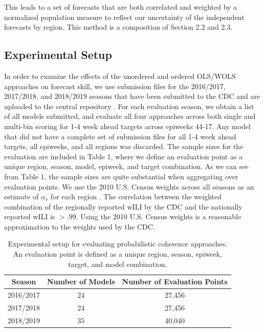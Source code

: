 \documentclass{umassthesis}          %
\begin{document}
This leads to a set of forecasts that are both correlated and weighted by a normalized population measure to reflect our uncertainty of the independent forecasts by region. This method is a composition of Section 2.2 and 2.3.



\subsection{Experimental Setup}

In order to examine the effects of the unordered and ordered OLS/WOLS approaches on forecast skill, we use submission files for the 2016/2017, 2017/2018, and 2018/2019 seasons that have been submitted to the CDC and are uploaded to the central repository \cite{forecasts}. For each evaluation season, we obtain a list of all models submitted, and evaluate all four approaches across both single and multi-bin scoring for 1-4 week ahead targets across epiweeks 44-17. Any model that did not have a complete set of submission files for all 1-4 week ahead targets, all epiweeks, and all regions was discarded.  The sample sizes for the evaluation are included in Table 1, where we define an evaluation point as a unique region, season, model, epiweek, and target combination. As we can see from Table 1, the sample sizes are quite substantial when aggregating over evaluation points. We use the 2010 U.S. Census weights across all seasons as an estimate of $\alpha_r$ for each region \cite{census}. The correlation between the weighted combination of the regionally reported wILI by the CDC and the nationally reported wILI is $>.99$.  Using the 2010 U.S. Census weights is a reasonable approximation to the weights used by the CDC.

\begin{table}[h!]
\caption{Experimental setup for evaluating probabilistic coherence approaches. An evaluation point is defined as a unique region, season, epiweek, target, and model combination.}
\begin{center}
\begin{tabular}{ |c|c|c| }
\hline
 \textbf{Season} & \textbf{Number of Models} & \textbf{Number of Evaluation Points} \\
 \hline
 2016/2017 & 24 & 27,456  \\
 \hline
 2017/2018& 24 & 27,456 \\
 \hline
 2018/2019 & 35 & 40,040 \\
 \hline
\end{tabular}
\end{center}

\end{table}
\end{document}
